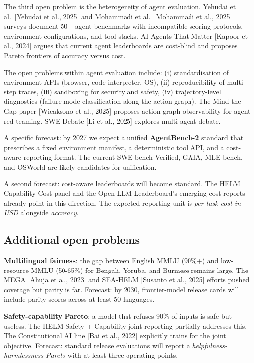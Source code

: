 The third open problem is the heterogeneity of agent evaluation. Yehudai et al.~{[}Yehudai et al., 2025{]} and Mohammadi et al.~{[}Mohammadi et al., 2025{]} surveys document 50+ agent benchmarks with incompatible scoring protocols, environment configurations, and tool stacks. AI Agents That Matter {[}Kapoor et al., 2024{]} argues that current agent leaderboards are cost-blind and proposes Pareto frontiers of accuracy versus cost.

The open problems within agent evaluation include: (i) standardisation of environment APIs (browser, code interpreter, OS), (ii) reproducibility of multi-step traces, (iii) sandboxing for security and safety, (iv) trajectory-level diagnostics (failure-mode classification along the action graph). The Mind the Gap paper {[}Wicaksono et al., 2025{]} proposes action-graph observability for agent red-teaming. SWE-Debate {[}Li et al., 2025{]} explores multi-agent debate.

A specific forecast: by 2027 we expect a unified \textbf{AgentBench-2} standard that prescribes a fixed environment manifest, a deterministic tool API, and a cost-aware reporting format. The current SWE-bench Verified, GAIA, MLE-bench, and OSWorld are likely candidates for unification.

A second forecast: cost-aware leaderboards will become standard. The HELM Capability Cost panel and the Open LLM Leaderboard's emerging cost reports already point in this direction. The expected reporting unit is \emph{per-task cost in USD} alongside \emph{accuracy}.

\subsection{Additional open problems}\label{additional-open-problems}

\textbf{Multilingual fairness}: the gap between English MMLU (90\%+) and low-resource MMLU (50-65\%) for Bengali, Yoruba, and Burmese remains large. The MEGA {[}Ahuja et al., 2023{]} and SEA-HELM {[}Susanto et al., 2025{]} efforts pushed coverage but parity is far. Forecast: by 2030, frontier-model release cards will include parity scores across at least 50 languages.

\textbf{Safety-capability Pareto}: a model that refuses 90\% of inputs is safe but useless. The HELM Safety + Capability joint reporting partially addresses this. The Constitutional AI line {[}Bai et al., 2022{]} explicitly trains for the joint objective. Forecast: standard release evaluations will report a \emph{helpfulness-harmlessness Pareto} with at least three operating points.

